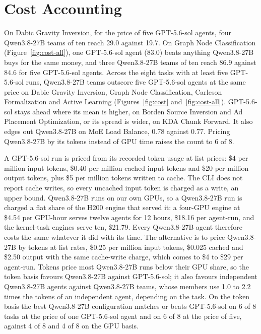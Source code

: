 \documentclass[numbers,10pt]{arxiv}
\begin{document}
\section{Cost Accounting}
\label{app:cost}
On Dabic Gravity Inversion, for the price of five GPT-5.6-sol agents, four Qwen3.8-27B teams of ten reach 29.0 against 19.7. On Graph Node Classification (Figure~\ref{fig:cost-all}), one GPT-5.6-sol agent (83.0) beats anything Qwen3.8-27B buys for the same money, and three Qwen3.8-27B teams of ten reach 86.9 against 84.6 for five GPT-5.6-sol agents. Across the eight tasks with at least five GPT-5.6-sol runs, Qwen3.8-27B teams outscore five GPT-5.6-sol agents at the same price on Dabic Gravity Inversion, Graph Node Classification, Carleson Formalization and Active Learning (Figures~\ref{fig:cost} and~\ref{fig:cost-all}). GPT-5.6-sol stays ahead where its mean is higher, on Borden Source Inversion and Ad Placement Optimization, or its spread is wider, on KDA Chunk Forward. It also edges out Qwen3.8-27B on MoE Load Balance, 0.78 against 0.77. Pricing Qwen3.8-27B by its tokens instead of GPU time raises the count to 6 of 8.

A GPT-5.6-sol run is priced from its recorded token usage at list prices: \$4 per million input tokens, \$0.40 per million cached input tokens and \$20 per million output tokens, plus \$5 per million tokens written to cache. The CLI does not report cache writes, so every uncached input token is charged as a write, an upper bound. Qwen3.8-27B runs on our own GPUs, so a Qwen3.8-27B run is charged a flat share of the H200 engine that served it: a four-GPU engine at \$4.54 per GPU-hour serves twelve agents for 12 hours, \$18.16 per agent-run, and the kernel-task engines serve ten, \$21.79. Every Qwen3.8-27B agent therefore costs the same whatever it did with its time. The alternative is to price Qwen3.8-27B by tokens at list rates, \$0.25 per million input tokens, \$0.025 cached and \$2.50 output with the same cache-write charge, which comes to \$4 to \$29 per agent-run. Tokens price most Qwen3.8-27B runs below their GPU share, so the token basis favours Qwen3.8-27B against GPT-5.6-sol; it also favours independent Qwen3.8-27B agents against Qwen3.8-27B teams, whose members use 1.0 to 2.2 times the tokens of an independent agent, depending on the task. On the token basis the best Qwen3.8-27B configuration matches or beats GPT-5.6-sol on 6 of 8 tasks at the price of one GPT-5.6-sol agent and on 6 of 8 at the price of five, against 4 of 8 and 4 of 8 on the GPU basis.
\end{document}
